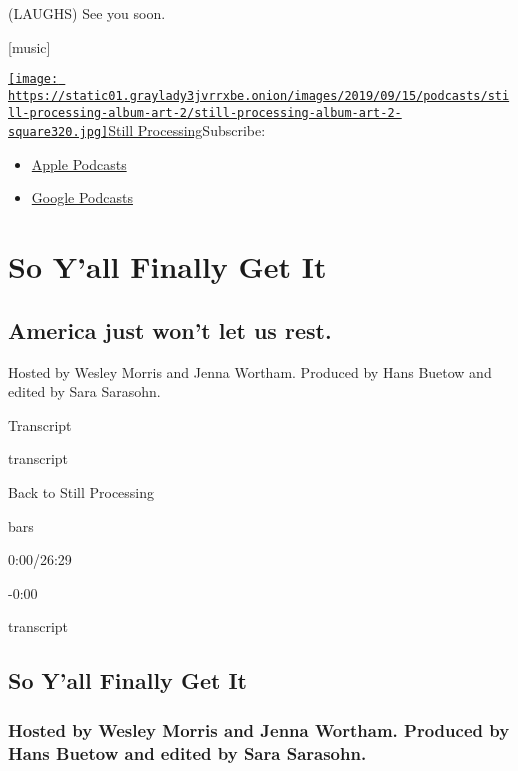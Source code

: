 (LAUGHS) See you soon.

{[}music{]}

\href{https://www.nytimes3xbfgragh.onion/column/still-processing-podcast}{\texttt{[image: https://static01.graylady3jvrrxbe.onion/images/2019/09/15/podcasts/still-processing-album-art-2/still-processing-album-art-2-square320.jpg]}Still
Processing}Subscribe:

\begin{itemize}
\tightlist
\item
  \href{https://itunes.apple.com/us/podcast/id1151436460}{Apple
  Podcasts}
\item
  \href{https://www.google.com/podcasts?feed=aHR0cHM6Ly9yc3MuYXJ0MTkuY29tL255dC1zdGlsbC1wcm9jZXNzaW5n}{Google
  Podcasts}
\end{itemize}

\hypertarget{so-yall-finally-get-it-1}{%
\section{So Y'all Finally Get It}\label{so-yall-finally-get-it-1}}

\hypertarget{america-just-wont-let-us-rest-1}{%
\subsection{America just won't let us
rest.}\label{america-just-wont-let-us-rest-1}}

Hosted by Wesley Morris and Jenna Wortham. Produced by Hans Buetow and
edited by Sara Sarasohn.

Transcript

transcript

Back to Still Processing

bars

0:00/26:29

-0:00

transcript

\hypertarget{so-yall-finally-get-it-2}{%
\subsection{So Y'all Finally Get It}\label{so-yall-finally-get-it-2}}

\hypertarget{hosted-by-wesley-morris-and-jenna-wortham-produced-by-hans-buetow-and-edited-by-sara-sarasohn-1}{%
\subsubsection{Hosted by Wesley Morris and Jenna Wortham. Produced by
Hans Buetow and edited by Sara
Sarasohn.}\label{hosted-by-wesley-morris-and-jenna-wortham-produced-by-hans-buetow-and-edited-by-sara-sarasohn-1}}

